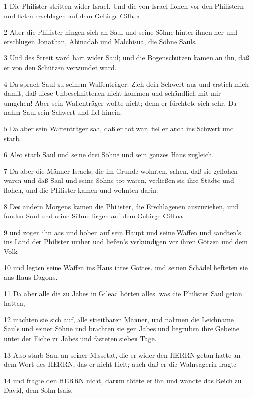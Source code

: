 \par 1 Die Philister stritten wider Israel. Und die von Israel flohen vor den Philistern und fielen erschlagen auf dem Gebirge Gilboa.
\par 2 Aber die Philister hingen sich an Saul und seine Söhne hinter ihnen her und erschlugen Jonathan, Abinadab und Malchisua, die Söhne Sauls.
\par 3 Und des Streit ward hart wider Saul; und die Bogenschützen kamen an ihn, daß er von den Schützen verwundet ward.
\par 4 Da sprach Saul zu seinem Waffenträger: Zieh dein Schwert aus und erstich mich damit, daß diese Unbeschnittenen nicht kommen und schändlich mit mir umgehen! Aber sein Waffenträger wollte nicht; denn er fürchtete sich sehr. Da nahm Saul sein Schwert und fiel hinein.
\par 5 Da aber sein Waffenträger sah, daß er tot war, fiel er auch ins Schwert und starb.
\par 6 Also starb Saul und seine drei Söhne und sein ganzes Haus zugleich.
\par 7 Da aber die Männer Israels, die im Grunde wohnten, sahen, daß sie geflohen waren und daß Saul und seine Söhne tot waren, verließen sie ihre Städte und flohen, und die Philister kamen und wohnten darin.
\par 8 Des andern Morgens kamen die Philister, die Erschlagenen auszuziehen, und fanden Saul und seine Söhne liegen auf dem Gebirge Gilboa
\par 9 und zogen ihn aus und hoben auf sein Haupt und seine Waffen und sandten's ins Land der Philister umher und ließen's verkündigen vor ihren Götzen und dem Volk
\par 10 und legten seine Waffen ins Haus ihres Gottes, und seinen Schädel hefteten sie ans Haus Dagons.
\par 11 Da aber alle die zu Jabes in Gilead hörten alles, was die Philister Saul getan hatten,
\par 12 machten sie sich auf, alle streitbaren Männer, und nahmen die Leichname Sauls und seiner Söhne und brachten sie gen Jabes und begruben ihre Gebeine unter der Eiche zu Jabes und fasteten sieben Tage.
\par 13 Also starb Saul an seiner Missetat, die er wider den HERRN getan hatte an dem Wort des HERRN, das er nicht hielt; auch daß er die Wahrsagerin fragte
\par 14 und fragte den HERRN nicht, darum tötete er ihn und wandte das Reich zu David, dem Sohn Isais.

